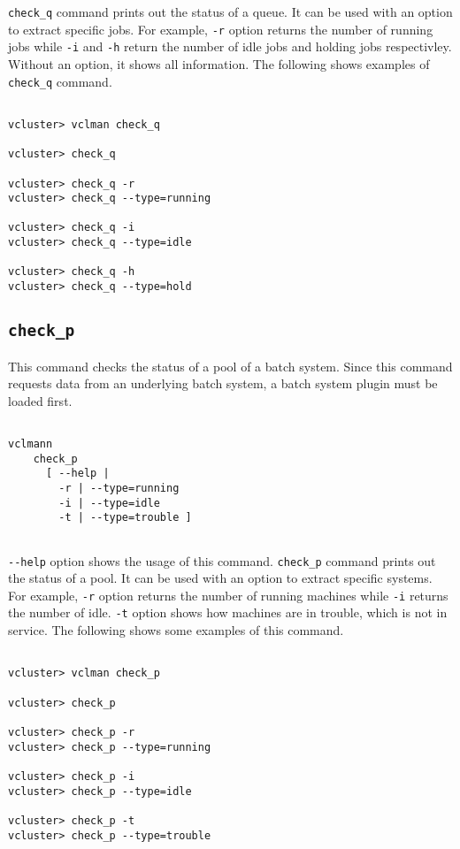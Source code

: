 \documentclass[11pt]{article}
\def \ttt{\texttt}
\def \vb{\verb}
\begin{document}
\vb+check_q+ command prints out the status of a queue. It can be used with an option to extract specific jobs. For example, \vb+-r+ option returns the number of running jobs while \vb+-i+ and \vb+-h+ return the number of idle jobs and holding jobs respectivley. Without an option, it shows all information. The following shows examples of \vb+check_q+ command.


\begin{Verbatim}[fontfamily=courier, fontsize = \small, obeytabs
=true, tabsize=4, frame=lines]

vcluster> vclman check_q

vcluster> check_q

vcluster> check_q -r
vcluster> check_q --type=running

vcluster> check_q -i
vcluster> check_q --type=idle

vcluster> check_q -h
vcluster> check_q --type=hold

\end{Verbatim}



\subsection{\ttt{check\_p}}

This command checks the status of a pool of a batch system. Since this command requests data from an underlying batch system, a batch system plugin must be loaded first.

\begin{Verbatim}[fontfamily=courier, fontsize = \small, obeytabs
=true, tabsize=4, frame=lines]

vclmann 
    check_p
      [ --help |
        -r | --type=running
        -i | --type=idle  
        -t | --type=trouble ] 
      
\end{Verbatim}

\vb+--help+ option shows the usage of this command.
\vb+check_p+ command prints out the status of a pool. It can be used with an option to extract specific systems. For example, \vb+-r+ option returns the number of running machines while \vb+-i+ returns the number of idle. \vb+-t+ option shows how machines are in trouble, which is not in service. The following shows some examples of this command.


\begin{Verbatim}[fontfamily=courier, fontsize = \small, obeytabs
=true, tabsize=4, frame=lines]

vcluster> vclman check_p

vcluster> check_p

vcluster> check_p -r
vcluster> check_p --type=running

vcluster> check_p -i
vcluster> check_p --type=idle

vcluster> check_p -t
vcluster> check_p --type=trouble

\end{Verbatim}
\end{document}
